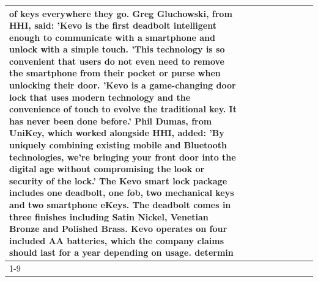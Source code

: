 \begin{table}[H]
\begin{tabular}{lllrlllll}
of keys everywhere they go. Greg Gluchowski, from HHI, said: 'Kevo is the first deadbolt intelligent enough to communicate with a smartphone and unlock with a simple touch. 'This technology is so convenient that users do not even need to remove the smartphone from their pocket or purse when unlocking their door. 'Kevo is a game-changing door lock that uses modern technology and the convenience of touch to evolve the traditional key. It has never been done before.' Phil Dumas, from UniKey, which worked alongside HHI, added: 'By uniquely combining existing mobile and Bluetooth technologies, we’re bringing your front door into the digital age without compromising the look or security of the lock.' The Kevo smart lock package includes one deadbolt, one fob, two mechanical keys and two smartphone eKeys. The deadbolt comes in three finishes including Satin Nickel, Venetian Bronze and Polished Brass. Kevo operates on four included AA batteries, which the company claims should last for a year depending on usage. determin \\
\cline{1-9}

\end{tabular}
\end{table}
